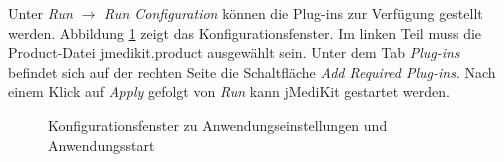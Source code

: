 Unter \textit{Run} $\rightarrow$ \textit{Run Configuration} können die Plug-ins zur Verfügung gestellt werden. Abbildung \ref{addplugins} zeigt das Konfigurationsfenster. Im linken Teil muss die Product-Datei jmedikit.product ausgewählt sein. Unter dem Tab \textit{Plug-ins} befindet sich auf der rechten Seite die Schaltfläche \textit{Add Required Plug-ins}. Nach einem Klick auf \textit{Apply} gefolgt von \textit{Run} kann jMediKit gestartet werden.

\begin{figure}[H]
  \vspace{0.5cm}
  \centering
  \caption{Konfigurationsfenster zu Anwendungseinstellungen und Anwendungsstart}
  \label{addplugins}
  \vspace{0.5cm}
\end{figure}